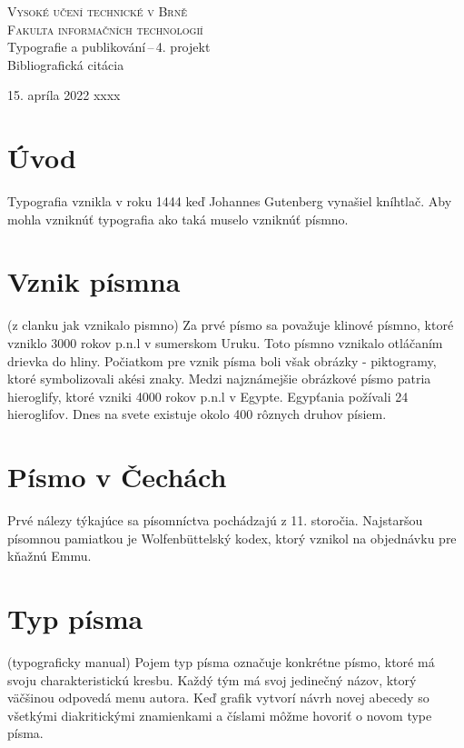 \documentclass[11pt, a4paper, titlepage]{article}
\begin{document}
\begin{titlepage}
    \begin{center}
    \Huge\textsc{Vysoké učení technické v Brně\\
                \huge{Fakulta informačních technologií}}\\
    \LARGE{Typografie a publikování\,--\,4. projekt}\\
            \Huge{Bibliografická citácia}\\
\end{center}
{\Large 15. apríla 2022 \hfill xxxx}
\end{titlepage}

\section*{Úvod} 
Typografia vznikla v roku 1444 keď Johannes Gutenberg vynašiel kníhtlač. Aby mohla vzniknúť typografia ako taká muselo vzniknúť písmno. \cite{Nova}

\section{Vznik písmna}
(z clanku jak vznikalo pismno)
Za prvé písmo sa považuje klinové písmno, ktoré vzniklo 3000 rokov p.n.l v sumerskom Uruku. Toto písmno vznikalo otláčaním drievka do hliny. 
Počiatkom pre vznik písma boli však obrázky - piktogramy, ktoré symbolizovali akési znaky. Medzi najznámejšie obrázkové písmo patria hieroglify, ktoré vzniki 4000 rokov p.n.l v Egypte. Egypťania požívali 24 hieroglifov.
Dnes na svete existuje okolo 400 rôznych druhov písiem. \cite{Sirucek} \cite{Valenta}

\section{Písmo v Čechách}
Prvé nálezy týkajúce sa písomníctva pochádzajú z 11. storočia. Najstaršou písomnou pamiatkou je Wolfenbüttelský kodex, ktorý vznikol na objednávku pre kňažnú Emmu. \cite{Nova}

\section{Typ písma}
(typograficky manual)
Pojem typ písma označuje konkrétne písmo, ktoré má svoju charakteristickú kresbu. Každý tým má svoj jedinečný názov, ktorý väčšinou odpovedá menu autora. Keď grafik vytvorí návrh novej abecedy so všetkými diakritickými znamienkami a číslami môžme hovoriť o novom type písma. \cite{Beran}
\end{document}

